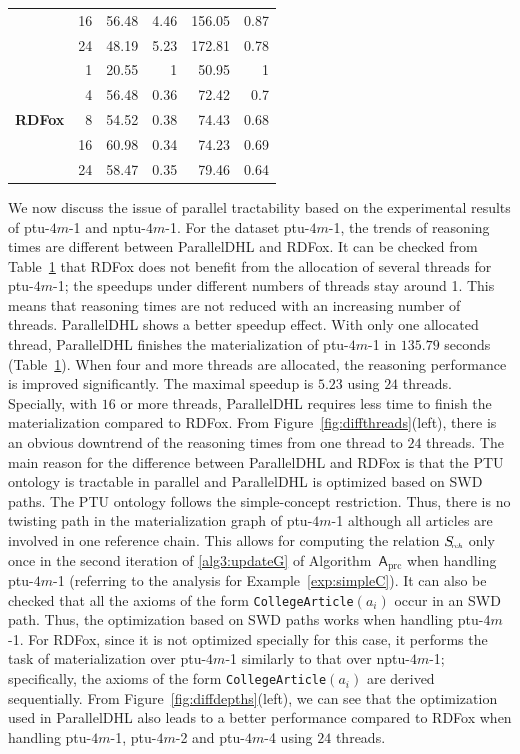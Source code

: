 \begin{table}
\begin{tabular}{|l|r|r|r|r|r|}
                                &16&56.48&4.46&156.05&0.87\\
                                &24&48.19&5.23&172.81&0.78\\
\hline
\multirow{5}{*}{ \textbf{RDFox}}&1&20.55&1&50.95&1\\
                                &4&56.48&0.36&72.42&0.7\\
                                &8&54.52&0.38&74.43&0.68\\
                                &16&60.98&0.34&74.23&0.69\\
                                &24&58.47&0.35&79.46&0.64\\
\hline
\end{tabular}
\label{tab:speedup}
\end{table}

We now discuss the issue of parallel tractability based on the experimental
results of ptu-$4m$-1 and nptu-$4m$-1.
For the dataset ptu-$4m$-1, the trends of reasoning times are different
between ParallelDHL and RDFox.
It can be checked from Table~\ref{tab:speedup} that
RDFox does not benefit from the allocation of several threads for ptu-$4m$-1;
the speedups under different numbers of threads stay around 1.
This means that reasoning times are not reduced with an increasing number of threads.
ParallelDHL shows a better speedup effect. With only one allocated thread, ParallelDHL finishes
the materialization of ptu-$4m$-1 in $135.79$ seconds (Table~\ref{tab:speedup}). When four and more threads
are allocated, the reasoning performance is improved significantly.
The maximal speedup is $5.23$ using $24$ threads.
Specially, with $16$ or more threads, ParallelDHL
requires less time to finish the materialization compared to RDFox.
From Figure~\ref{fig:diffthreads}(left), there is an obvious downtrend of the reasoning times
from one thread to $24$ threads.
The main reason for the difference between ParallelDHL and RDFox
is that the PTU ontology is tractable in parallel and ParallelDHL
is optimized based on SWD paths. The PTU ontology follows the
simple-concept restriction. Thus, there is no twisting path in
the materialization graph of ptu-$4m$-1 although all articles are involved
in one reference chain. This allows for computing the relation $S_{\textit{\!\tiny
    rch}}$ only once in the second iteration of \ref{alg3:updateG} of Algorithm~$\mathsf{A}_{\text{prc}}$
when handling ptu-$4m$-1 (referring to the analysis for Example~\ref{exp:simpleC}).
It can also be checked that all the axioms of the form \texttt{CollegeArticle}$(a_i)$ occur in
an SWD path. Thus, the optimization based on SWD paths works when handling ptu-$4m$-1.
For RDFox, since it is not optimized specially for this case, it performs the task of
materialization over ptu-$4m$-1 similarly to that over nptu-$4m$-1;
specifically, the axioms of the form \texttt{CollegeArticle}$(a_i)$ are derived sequentially.
From Figure~\ref{fig:diffdepths}(left), we can see that the optimization used in ParallelDHL
also leads to a better performance compared to
RDFox when handling ptu-$4m$-1, ptu-$4m$-2 and ptu-$4m$-4 using $24$ threads.

